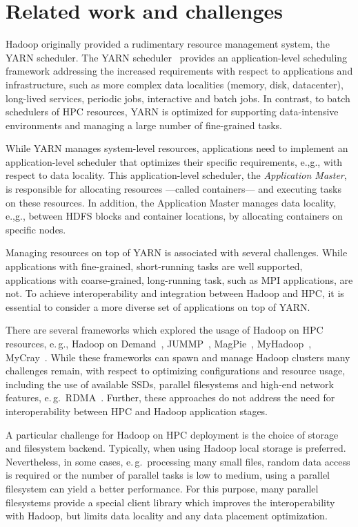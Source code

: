\section{Related work and challenges}
\label{sec:hpc_hadoop_rel}
Hadoop originally provided a rudimentary resource management system, the YARN scheduler.
The YARN scheduler~\cite{vavilapalli2013apache} provides an application-level scheduling framework addressing the increased requirements with respect to applications and infrastructure, such as more complex data localities (memory, disk, datacenter), long-lived services, periodic jobs, interactive and batch jobs.
In contrast, to batch schedulers of HPC resources, YARN is optimized for supporting data-intensive environments and managing a large number of fine-grained tasks.

While YARN manages system-level resources, applications need to implement an application-level scheduler that optimizes their specific requirements, e.,g., with respect to data locality.
This application-level scheduler, the \textit{Application Master}, is responsible for allocating resources ---called containers---  and executing tasks on these resources.
In addition, the Application Master manages data locality, e.,g., between HDFS blocks and container locations, by allocating containers on specific nodes.

Managing resources on top of YARN is associated with several challenges.
While applications with fine-grained, short-running tasks are well supported, applications with coarse-grained, long-running task, such as MPI applications, are not.
To achieve interoperability and integration between Hadoop and HPC, it is essential to consider a more diverse set of applications on top of YARN.

There are several frameworks which explored the usage of Hadoop on HPC resources, e.\,g., Hadoop on Demand~\cite{hod}, JUMMP~\cite{moody2013jummp}, MagPie~\cite{chu2015magpie}, MyHadoop~\cite{krishnan2011myhadoop}, MyCray~\cite{mycray}.
While these frameworks can spawn and manage Hadoop clusters many challenges remain, with respect to optimizing configurations and resource usage, including the use of available SSDs, parallel filesystems and high-end network features, e.\,g.\ RDMA~\cite{rahman2014homr}.
Further, these approaches do not address the need for interoperability between HPC and Hadoop application stages.

A particular challenge for Hadoop on HPC deployment is the choice of storage and filesystem backend.
Typically, when using Hadoop local storage is preferred.
Nevertheless, in some cases, e.\,g.\ processing many small files, random data access is required or the number of parallel tasks is low to medium, using a parallel filesystem can yield a better performance.
For this purpose, many parallel filesystems provide a special client library which improves the interoperability with Hadoop, but limits data locality and any data placement optimization.

